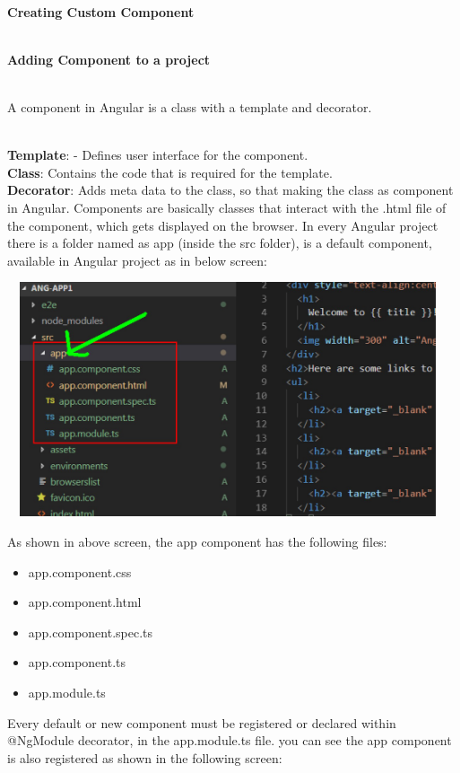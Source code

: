 \documentclass{article}
\begin{document}
\noindent 

\noindent 

\noindent 

\noindent 

\noindent 
\\  
\newpage
{\large \noindent \textbf{Creating Custom Component }}

\noindent 
\\  
\noindent \textbf{Adding Component to a project}

\noindent \textbf{}
\\  
\noindent A component in Angular is a class with a template and decorator.

\noindent 
\\  
\noindent \textbf{Template}: - Defines user interface for the component.
\\
   
\noindent \textbf{Class}:  Contains the code that is required for the template.
\\   

\noindent \textbf{Decorator}: Adds meta data to the class, so that making the class as component in Angular. Components are basically classes that interact with the .html file of the component, which gets displayed on the browser. In every Angular project there is a folder named as app (inside the src folder), is a default component, available in Angular project as in below screen: \\
 

\noindent \begin{center}
	\includegraphics*[width=5.12in, height=2.72in]{IMG-02-01}
\end{center}

\noindent As shown in above screen, the app component has the following files:

\begin{itemize}
	\item app.component.css
	\item app.component.html
	\item app.component.spec.ts
	\item app.component.ts
	\item app.module.ts
\end{itemize}
\noindent Every default or new component must be registered or declared within @NgModule decorator, in the app.module.ts file. you can see the app component is also registered as shown
in the following screen:
\end{document}
